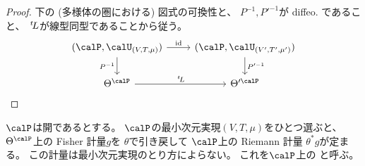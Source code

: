 \documentclass[report]{jlreq}
\begin{document}
\begin{proof}
    下の (多様体の圏における) 図式の可換性と、
    $P^{-1}, P'^{-1}$が diffeo. であること、
    $\,{}^{t}\!L$が線型同型であることから従う。
    \begin{equation}
        \begin{tikzcd}
            (\calP, \calU_{(V, T, \mu)})
                \ar{d}[swap]{P^{-1}}
                \ar{r}{\id}
                &(\calP, \calU_{(V', T', \mu')})
                    \ar{d}{P'^{-1}}
                \\
            \Theta^\calP
                \ar{r}{\up{t}L}
                &\Theta'^\calP
        \end{tikzcd}
    \end{equation}
\end{proof}

\begin{propdef}
    $\calP$は開であるとする。
    $\calP$の最小次元実現$(V, T, \mu)$をひとつ選ぶと、
    $\Theta^\calP$上の Fisher 計量$g$を
    $\theta$で引き戻して
    $\calP$上の Riemann 計量
    $\theta^* g$が定まる。
    この計量は最小次元実現のとり方によらない。
    これを$\calP$上の
    と呼ぶ。
\end{propdef}
\end{document}
